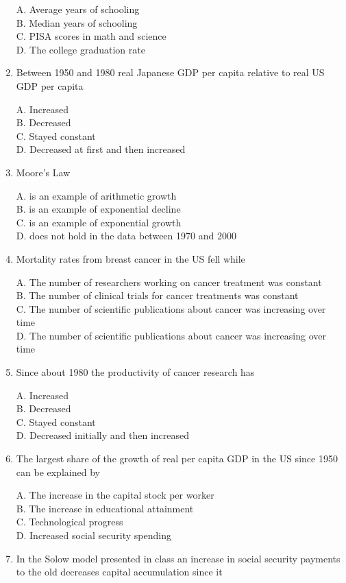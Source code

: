 \documentclass[
]{book}
\begin{document}
\begin{enumerate}
  A. Average years of schooling\\
  B. Median years of schooling\\
  C. PISA scores in math and science\\
  D. The college graduation rate
\item
  Between 1950 and 1980 real Japanese GDP per capita relative to real US GDP per capita

  A. Increased\\
  B. Decreased\\
  C. Stayed constant\\
  D. Decreased at first and then increased
\item
  Moore's Law

  A. is an example of arithmetic growth\\
  B. is an example of exponential decline\\
  C. is an example of exponential growth\\
  D. does not hold in the data between 1970 and 2000
\item
  Mortality rates from breast cancer in the US fell while

  A. The number of researchers working on cancer treatment was constant\\
  B. The number of clinical trials for cancer treatments was constant\\
  C. The number of scientific publications about cancer was increasing over time\\
  D. The number of scientific publications about cancer was increasing over time
\item
  Since about 1980 the productivity of cancer research has

  A. Increased\\
  B. Decreased\\
  C. Stayed constant\\
  D. Decreased initially and then increased
\item
  The largest share of the growth of real per capita GDP in the US since 1950 can be explained by

  A. The increase in the capital stock per worker\\
  B. The increase in educational attainment\\
  C. Technological progress\\
  D. Increased social security spending
\item
  In the Solow model presented in class an increase in social security payments to the old decreases capital accumulation since it


\end{enumerate}
\end{document}
